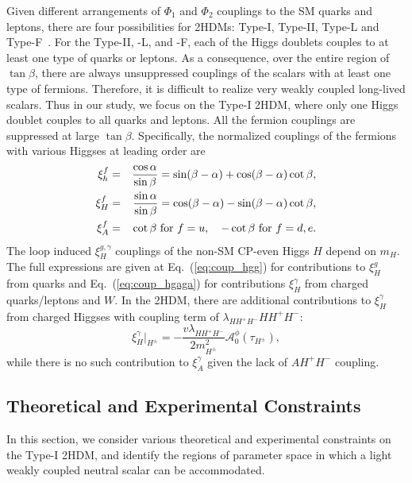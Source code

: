\documentclass[letterpaper,11pt]{article}
\def\cosba{\cos(\beta-\alpha)}
\begin{document}
Given different arrangements of $\Phi_1$ and $\Phi_2$ couplings to the SM quarks and leptons, there are four possibilities for 2HDMs: Type-I, Type-II, Type-L and Type-F~\cite{Branco:2011iw}.
For the Type-II, -L, and -F, each of the Higgs doublets couples to at least one type of quarks or leptons.  As a consequence, over the entire region of $\tan\beta$, there are always unsuppressed couplings of the scalars with at least one type of fermions.  Therefore, it is difficult to realize very weakly coupled long-lived scalars.    Thus in our study, we focus on the Type-I 2HDM, where only one Higgs doublet couples to all quarks and leptons.   All the fermion couplings are suppressed at large $\tan\beta$.  Specifically,  the  normalized couplings of the fermions with various Higgses at leading order are
\begin{eqnarray}
    \xi_h^f&=&\frac{\cos\alpha}{\sin\beta}=\sin(\beta-\alpha)+\cosba \cot\beta, \nonumber \\
    \xi_H^f&=&\frac{\sin\alpha}{\sin\beta}=\cosba-\sin(\beta-\alpha) \cot\beta, \nonumber \\ 
    \xi_A^f&=&\cot\beta {\rm \ for\ }f=u, \ \ \ -\cot\beta {\rm\ for\ }f=d,e. 
\end{eqnarray}
The loop induced $\xi_{H}^{g, \gamma}$ couplings of the non-SM CP-even Higgs $H$ depend on $m_H$.   The full expressions are given at Eq.~(\ref{eq:coup_hgg}) for contributions to $\xi_{H}^{g}$ from quarks  and Eq.~(\ref{eq:coup_hgaga}) for contributions $\xi_{H}^{\gamma}$ from charged quarks/leptons and $W$.     In the 2HDM, there are additional contributions to $\xi_{H}^{\gamma}$ from charged Higgses with coupling term of $\lambda_{HH^+H^-}H H^+H^-$:
\begin{equation}
    \xi_H^\gamma|_{H^\pm} = -\frac{v \lambda_{H H^{+} H^{-}}}{2m_{H^{\pm}}^{2}} \mathcal{A}_{0}^{\phi}\left(\tau_{H^{\pm}}\right),
    \label{eq:coup_hgaga_Hpm}
\end{equation}
% 
while there is no such contribution to $\xi_A^\gamma$ given the lack of $AH^+H^-$ coupling. 


\subsection{Theoretical and Experimental Constraints}
 
 In this section, we consider various theoretical and experimental constraints on the Type-I 2HDM, and identify the regions of parameter space in which a light weakly coupled neutral scalar can be accommodated.
\end{document}
